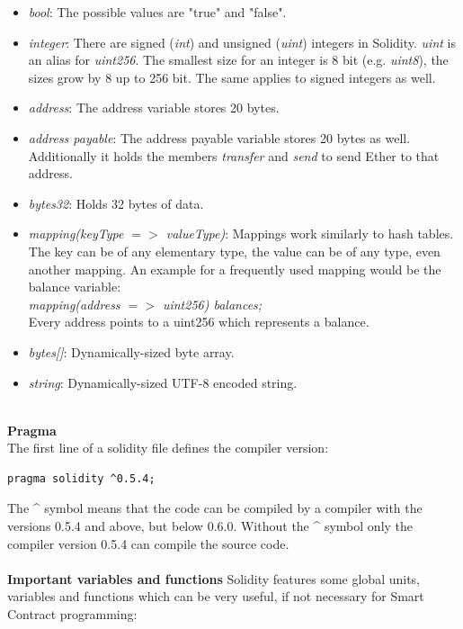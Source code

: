 \begin{itemize}
  \item \textit{bool}: The possible values are "true" and "false".
  \item \textit{integer}: There are signed (\textit{int}) and unsigned (\textit{uint}) integers in Solidity. \textit{uint} is an alias for \textit{uint256}. The smallest size for an integer is 8 bit (e.g. \textit{uint8}), the sizes grow by 8 up to 256 bit. The same applies to signed integers as well.
  \item \textit{address}: The address variable stores 20 bytes.
  \item \textit{address payable}: The address payable variable stores 20 bytes as well. Additionally it holds the members \textit{transfer} and \textit{send} to send Ether to that address.
  \item \textit{bytes32}: Holds 32 bytes of data.
  \item \textit{mapping(keyType $=>$ valueType)}: Mappings work similarly to hash tables. The key can be of any elementary type, the value can be of any type, even another mapping. An example for a frequently used mapping would be the balance variable:
  \\
  \textit{mapping(address $=>$ uint256) balances;}
  \\
  Every address points to a uint256 which represents a balance.
  \item \textit{bytes[]}: Dynamically-sized byte array.
  \item \textit{string}: Dynamically-sized UTF-8 encoded string.
\end{itemize}
\leavevmode
\\
\textbf{Pragma}\\
The first line of a solidity file defines the compiler version\cite{doc-pragma}:
\begin{lstlisting}[language=Solidity, numbers=none]
  pragma solidity ^0.5.4;
\end{lstlisting}
The \^{} symbol means that the code can be compiled by a compiler with the versions 0.5.4 and above, but below 0.6.0. Without the \^{} symbol only the compiler version 0.5.4 can compile the source code.
\\\\
\textbf{Important variables and functions}
Solidity features some global units, variables and functions which can be very useful, if not necessary for Smart Contract programming:
